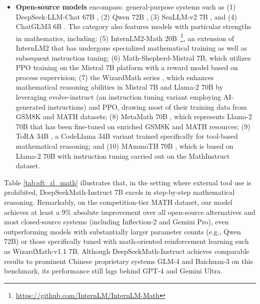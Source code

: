 \begin{itemize}[topsep=0pt]
\begin{itemize}[topsep=0pt]
    \item \textbf{Closed-source models} encompass the following: (1) the GPT series, with GPT-4 \citep{gpt4} and GPT-4 Code Interpreter~\footnote{\url{https://openai.com/blog/chatgpt-plugins\#\#code-interpreter}} representing the most advanced variants, (2) Gemini Ultra and Pro \citep{gemini}, (3) Inflection-2 \citep{inflection-2}, (4) Grok-1~\footnote{\url{https://x.ai/model-card}}, in addition to models recently introduced by Chinese enterprises, such as (5) Baichuan-3~\footnote{\url{https://www.baichuan-ai.com}}, (6) and the latest iteration, GLM-4~\footnote{\url{https://open.bigmodel.cn/dev/api\#glm-4}}
\end{itemize}

    from the GLM family \citep{glm}.

These models are designed for broad applicability and have typically been subjected to multiple alignment stages. 
    \item \textbf{Open-source models} encompass: general-purpose systems such as (1) DeepSeek-LLM-Chat 67B \citep{deepseek-llm}, (2) Qwen 72B \citep{qwen}, (3) SeaLLM-v2 7B \citep{seallm}, and (4) ChatGLM3 6B \citep{chatglm3}. The category also features models with particular strengths in mathematics, including: (5) InternLM2-Math 20B~\footnote{\url{https://github.com/InternLM/InternLM-Math}}, an extension of InternLM2 that has undergone specialized mathematical training as well as subsequent instruction tuning; (6) Math-Shepherd-Mistral 7B, which utilizes PPO training \citep{schulman2017proximal} on the Mistral 7B \citep{mistral} platform with a reward model based on process supervision; (7) the WizardMath series \citep{wizardmath}, which enhances mathematical reasoning abilities in Mistral 7B and Llama-2 70B \citep{llama2} by leveraging evolve-instruct (an instruction tuning variant employing AI-generated instructions) and PPO, drawing most of their training data from GSM8K and MATH datasets; (8) MetaMath 70B \citep{metamath}, which represents Llama-2 70B that has been fine-tuned on enriched GSM8K and MATH resources; (9) ToRA 34B \cite{tora}, a CodeLlama 34B variant trained specifically for tool-based mathematical reasoning; and (10) MAmmoTH 70B \citep{MathInstruct}, which is based on Llama-2 70B with instruction tuning carried out on the MathInstruct dataset.
\end{itemize}

Table \ref{tab:sft_rl_math} illustrates that, in the setting where external tool use is prohibited, DeepSeekMath-Instruct 7B excels in step-by-step mathematical reasoning. Remarkably, on the competition-tier MATH dataset, our model achieves at least a 9\% absolute improvement over all open-source alternatives and most closed-source systems (including Inflection-2 and Gemini Pro), even outperforming models with substantially larger parameter counts (e.g., Qwen 72B) or those specifically tuned with math-oriented reinforcement learning such as WizardMath-v1.1 7B. Although DeepSeekMath-Instruct achieves comparable results to prominent Chinese proprietary systems GLM-4 and Baichuan-3 on this benchmark, its performance still lags behind GPT-4 and Gemini Ultra.

